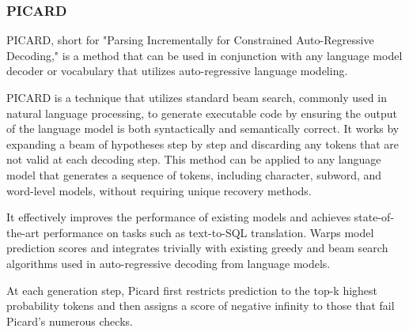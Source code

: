 \subsubsection{PICARD}



PICARD\cite{Scholak2021:PICARD}, short for "Parsing Incrementally for Constrained Auto-Regressive Decoding," is a method that can be used in conjunction with any language model decoder or vocabulary that utilizes auto-regressive language modeling.

PICARD is a technique that utilizes standard beam search, commonly used in natural language processing, to generate executable code by ensuring the output of the language model is both syntactically and semantically correct. It works by expanding a beam of hypotheses step by step and discarding any tokens that are not valid at each decoding step. This method can be applied to any language model that generates a sequence of tokens, including character, subword, and word-level models, without requiring unique recovery methods.

It effectively improves the performance of existing models and achieves state-of-the-art performance on tasks such as text-to-SQL translation.
Warps model prediction scores and integrates trivially with existing greedy and beam search algorithms used in auto-regressive decoding from language models.

At each generation step, Picard first restricts prediction to the top-k highest probability tokens and then assigns a score of negative infinity to those that fail Picard's numerous checks.

